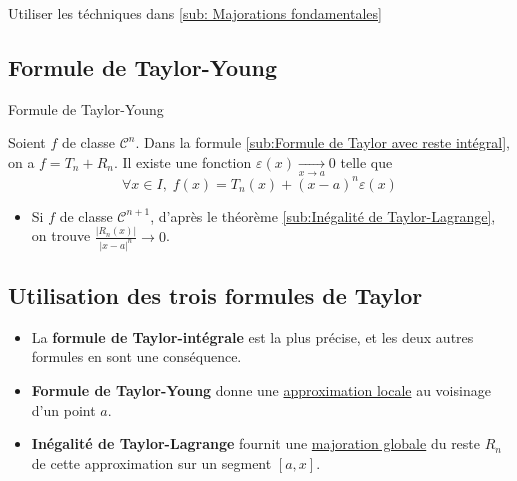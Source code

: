 \begin{myproof}{}{}
  Utiliser les téchniques dans \ref{sub: Majorations fondamentales}
\end{myproof}


\subsection{Formule de Taylor-Young} %
\label{sub:Formule de Taylor-Young}

\begin{Theorem}{\color{red} Formule de Taylor-Young}{}

  Soient $f$ de classe $\mathscr{C} ^{n}$. Dans la formule \ref{sub:Formule de Taylor avec reste intégral}, on a $f = T_n + R_n$. Il existe une fonction $\varepsilon (x)  \underset{x \to a}{\longrightarrow} 0$ telle que 
  \begin{equation}
    \forall x \in I, \; f(x) = T_n(x) + (x-a) ^{n}\varepsilon(x)
  \end{equation}
\end{Theorem}

\begin{myproof}{}{}
\begin{itemize}

  \item Si $f$ de classe $\mathscr{C} ^{n+1}$, d'après le théorème \ref{sub:Inégalité de Taylor-Lagrange}, on trouve $\frac{|R_n(x)|}{|x-a| ^{n}} \to 0$.

\end{itemize}
\end{myproof}

\subsection{Utilisation des trois formules de Taylor} %

\begin{itemize}

    \item La \textbf{formule de Taylor-intégrale} est la plus précise, et les deux autres formules en sont une conséquence. 
    \item \textbf{Formule de Taylor-Young} donne une \underline{approximation locale} au voisinage d'un point $a$. 
    \item \textbf{Inégalité de Taylor-Lagrange} fournit une \underline{majoration globale} du reste $R_n$ de cette approximation sur un segment $[a,x]$.

\end{itemize}
